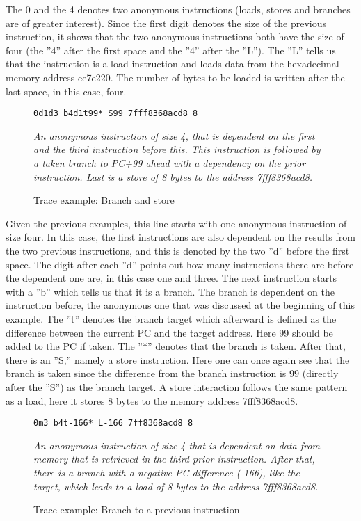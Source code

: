 The 0 and the 4 denotes two anonymous instructions (loads, stores and branches
are of greater interest). Since the first digit denotes the size of the previous instruction,
it shows that the two anonymous instructions both have the size of four (the ”4” after
the first space and the ”4” after the ”L”). The ”L” tells us that the instruction is a
load instruction and loads data from the hexadecimal memory address ee7e220. The
number of bytes to be loaded is written after the last space, in this case, four.

\begin{figure}[h]
\begin{lstlisting}[frame=single]  
0d1d3 b4d1t99* S99 7fff8368acd8 8
\end{lstlisting}
\centering
\emph{An anonymous instruction of size 4, that is dependent on the first and the third instruction before this. This instruction is followed by a taken branch to PC+99 ahead with a dependency on the prior instruction. Last is a store of 8 bytes to the address
7fff8368acd8.}
  \caption{Trace example: Branch and store}
\end{figure}

Given the previous examples, this line starts with one anonymous instruction of
size four. In this case, the first instructions are also dependent on the results from the
two previous instructions, and this is denoted by the two ”d” before the first space. The
digit after each ”d” points out how many instructions there are before the dependent one are, in this case one and three. The next instruction starts with a ”b” which tells us that it is a
branch. The branch is dependent on the instruction before, the anonymous one that
was discussed at the beginning of this example. The ”t” denotes the branch target
which afterward is defined as the difference between the current PC and the target address. Here 99 should be added to the PC if taken. The ”*” denotes that the branch is taken. After
that, there is an ”S,” namely a store instruction. Here one can once again see that the
branch is taken since the difference from the branch instruction is 99 (directly after
the ”S”) as the branch target. A store interaction follows the same pattern as a load,
here it stores 8 bytes to the memory address 7fff8368acd8.

\begin{figure}[h]
\begin{lstlisting}[frame=single]  
0m3 b4t-166* L-166 7ff8368acd8 8
\end{lstlisting}
\centering
\emph{An anonymous instruction of size 4 that is dependent on data from memory that is retrieved in the third prior instruction. After that, there is a branch with a
negative PC difference (-166), like the target, which leads to a load of 8 bytes to the
address 7fff8368acd8.}
  \caption{Trace example: Branch to a previous instruction}
\end{figure}

